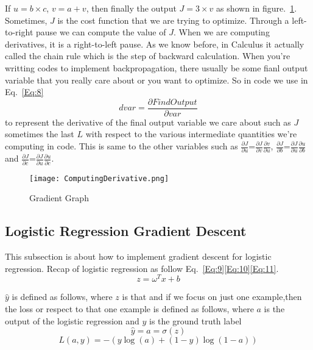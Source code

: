 \documentclass[a4paper]{article}
\begin{document}
If $u = b \times c $, $v = a + v $, then finally the output $J = 3 \times v$ as shown in figure.~\ref{fig:GG}. Sometimes, $J$ is the cost function that we are trying to optimize. Through a left-to-right pause we can compute the value of $J$. When we are computing derivatives, it is a right-to-left pause. As we know before, in Calculus it actually called the chain rule which is the step of backward calculation. When you're writting codes to implement backpropagation, there usually be some fianl output variable that you really care about or you want to optimize. So in code we use in Eq.~\ref{Eq:8}
\begin{equation}
dvar = \frac{\partial FindOutput}{\partial var}
\label{Eq:8}
\end{equation} to represent the derivative of the final output variable we care about such as $J$ sometimes the last $L$ with respect to the various intermediate quantities we're computing in code. This is same to the other variables such as $\frac{\partial J}{\partial u}$=$\frac{\partial J}{\partial v} \frac{\partial v}{\partial u}$, $\frac{\partial J}{\partial b}$=$\frac{\partial J}{\partial u} \frac{\partial u}{\partial b}$ and $\frac{\partial J}{\partial c}$=$\frac{\partial J}{\partial u} \frac{\partial u}{\partial c}$.

\begin{figure}[!htp]
\begin{center}
   \texttt{[image: ComputingDerivative.png]}
\end{center}
   \caption{Gradient Graph}
\label{fig:GG}
\end{figure}


\subsection{Logistic Regression Gradient Descent}
This subsection is about how to implement gradient descent for logistic regression. Recap of logistic regression as follow Eq.~\ref{Eq:9}\ref{Eq:10}\ref{Eq:11}.
\begin{equation}
z=\omega^Tx+b
\label{Eq:9}
\end{equation}\par
$\hat{y}$ is defined as follows, where $z$ is that and if we focus on just one example,then the loss or respect to that one example is defined as follows, where $a$ is the output of the logistic regression and $y$ is the ground truth label
\begin{equation}
\hat{y}=a=\sigma(z)
\label{Eq:10}
\end{equation}
\begin{equation}
L(a,y)=-(y\log(a)+(1-y)\log(1-a))
\label{Eq:11}
\end{equation}
\end{document}
